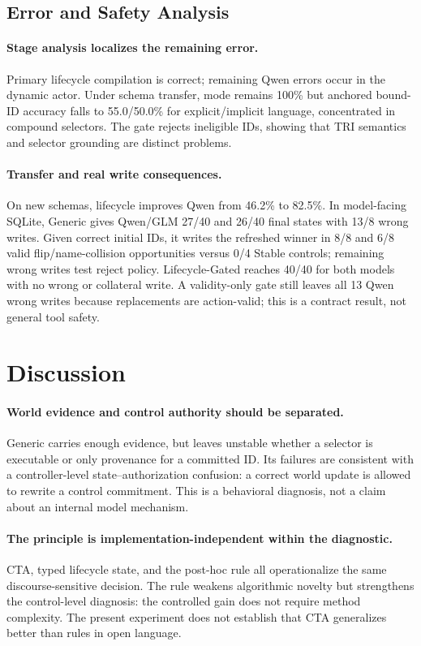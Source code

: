 \documentclass[letterpaper]{article}
\begin{document}
\subsection{Error and Safety Analysis}
\paragraph{Stage analysis localizes the remaining error.}
Primary lifecycle compilation is correct; remaining Qwen errors occur in the dynamic actor.
Under schema transfer, mode remains 100\% but anchored bound-ID accuracy falls to 55.0/50.0\%
for explicit/implicit language, concentrated in compound selectors. The gate rejects ineligible
IDs, showing that TRI semantics and selector grounding are distinct problems.

\paragraph{Transfer and real write consequences.}
On new schemas, lifecycle improves Qwen from 46.2\% to 82.5\%. In model-facing SQLite, Generic
gives Qwen/GLM 27/40 and 26/40 final states with 13/8 wrong writes. Given correct initial IDs,
it writes the refreshed winner in 8/8 and 6/8 valid flip/name-collision opportunities versus 0/4
Stable controls; remaining wrong writes test reject policy. Lifecycle-Gated reaches 40/40 for both
models with no wrong or collateral write. A validity-only gate still leaves all 13 Qwen wrong
writes because replacements are action-valid; this is a contract result, not general tool safety.

\section{Discussion}

\paragraph{World evidence and control authority should be separated.}
Generic carries enough evidence, but leaves unstable whether a selector is executable or only
provenance for a committed ID. Its failures are consistent with a controller-level
state--authorization confusion: a correct world update is allowed to rewrite a control commitment.
This is a behavioral diagnosis, not a claim about an internal model mechanism.

\paragraph{The principle is implementation-independent within the diagnostic.}
CTA, typed lifecycle state, and the post-hoc rule all operationalize the same discourse-sensitive
decision. The rule weakens algorithmic novelty but strengthens the control-level diagnosis:
the controlled gain does not require method complexity. The present experiment does not establish
that CTA generalizes better than rules in open language.
\end{document}
